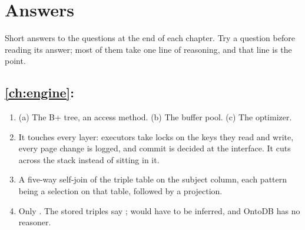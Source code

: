 \chapter{Answers}
\label{app:answers}

Short answers to the questions at the end of each chapter. Try a question
before reading its answer; most of them take one line of reasoning, and that
line is the point.

\newcommand{\answers}[1]{\section*{\cref{#1}: \nameref{#1}}\begin{enumerate}[label=\getrefnumber{#1}.\arabic*,leftmargin=2.4em]}

\answers{ch:engine}
\item (a) The B+ tree, an access method. (b) The buffer pool. (c) The optimizer.
\item It touches every layer: executors take locks on the keys they read and write, every page change is logged, and commit is decided at the interface. It cuts across the stack instead of sitting in it.
\item A five-way self-join of the triple table on the subject column, each pattern being a selection on that table, followed by a projection.
\item Only . The stored triples say ;  would have to be inferred, and OntoDB has no reasoner.
\end{enumerate}

